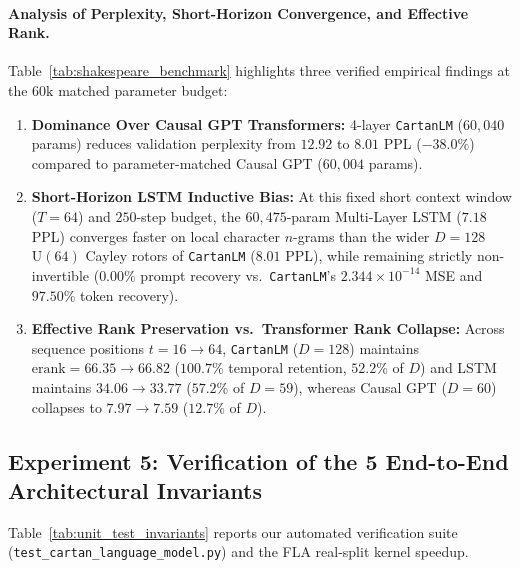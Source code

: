 \documentclass[11pt,a4paper]{article}
\begin{document}
\paragraph{Analysis of Perplexity, Short-Horizon Convergence, and Effective Rank.}
Table~\ref{tab:shakespeare_benchmark} highlights three verified empirical findings at the $60\text{k}$ matched parameter budget:
\begin{enumerate}
    \item \textbf{Dominance Over Causal GPT Transformers:} 4-layer \texttt{CartanLM} ($60,040$ params) reduces validation perplexity from $12.92$ to $8.01$ PPL ($-38.0\%$) compared to parameter-matched Causal GPT ($60,004$ params).
    \item \textbf{Short-Horizon LSTM Inductive Bias:} At this fixed short context window ($T=64$) and $250$-step budget, the $60,475$-param Multi-Layer LSTM ($7.18$ PPL) converges faster on local character $n$-grams than the wider $D=128$ $\mathrm{U}(64)$ Cayley rotors of \texttt{CartanLM} ($8.01$ PPL), while remaining strictly non-invertible ($0.00\%$ prompt recovery vs.\ \texttt{CartanLM}'s $2.344\times 10^{-14}$ MSE and $97.50\%$ token recovery).
    \item \textbf{Effective Rank Preservation vs.\ Transformer Rank Collapse:} Across sequence positions $t = 16 \to 64$, \texttt{CartanLM} ($D=128$) maintains $\mathrm{erank} = 66.35 \to 66.82$ ($100.7\%$ temporal retention, $52.2\%$ of $D$) and LSTM maintains $34.06 \to 33.77$ ($57.2\%$ of $D=59$), whereas Causal GPT ($D=60$) collapses to $7.97 \to 7.59$ ($12.7\%$ of $D$).
\end{enumerate}

\subsection{Experiment 5: Verification of the 5 End-to-End Architectural Invariants}
Table~\ref{tab:unit_test_invariants} reports our automated verification suite (\texttt{test\_\allowbreak cartan\_\allowbreak language\_\allowbreak model.py}) and the FLA real-split kernel speedup.
\end{document}
